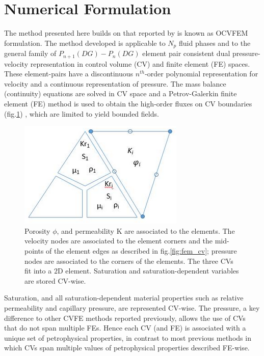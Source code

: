 \documentclass[preprint,authoryear,12pt]{elsarticle}
\begin{document}
\section{Numerical Formulation}\label{section:NumericalFormulation}
The method presented here builds on that reported by \citet{jackson_2015} is known as OCVFEM formulation. The method developed is applicable to $N_{p}$ fluid phases and to the general family of $P_{n+1}(DG)-P_{n}(DG)$ element pair consistent dual pressure-velocity representation in control volume (CV) and finite element (FE) spaces. These element-pairs have a discontinuous $n^{th}$-order polynomial representation for velocity and a continuous representation of pressure. The mass balance (continuity) equations are solved in CV space and a Petrov-Galerkin finite element (FE) method is used to obtain the high-order fluxes on CV boundaries (fig.\ref{fig:fem_elem})  , which are limited to yield bounded fields.

\begin{figure}[h]
\centering
\includegraphics[width=.5\textwidth]{./Pics/P1DGP2_ele.png}
\caption{Porosity $\phi$, and permeability K are associated to the elements. The velocity nodes are associated to the element corners and the mid-points of the element edges as described in fig.\ref{fig:fem_cv}; pressure nodes are associated to the corners of the elements. The three CVs fit into a $2$D element. Saturation and saturation-dependent variables are stored CV-wise.}
\label{fig:fem_elem}
\end{figure}

Saturation, and all saturation-dependent material properties such as relative permeability and capillary pressure, are represented CV-wise. The pressure, a key difference to other CVFE methods reported previously, allows the use of CVs that do not span multiple FEs. Hence each CV (and FE) is associated with a unique set of petrophysical properties, in contrast to most previous methods in which CVs span multiple values of petrophysical properties described FE-wise.
\end{document}
